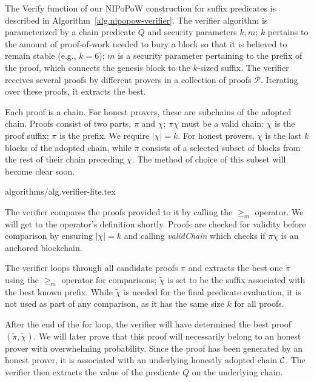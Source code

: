 The \textsf{Verify} function of our NIPoPoW construction  for suffix predicates
is described in
Algorithm~\ref{alg.nipopow-verifier}. The verifier algorithm is parameterized by
a chain predicate $Q$ and security parameters $k, m$; $k$
pertains to the amount of proof-of-work needed to bury a block so that it is
believed to remain stable (e.g., $k = 6$); $m$ is a security
parameter pertaining to the prefix of the proof, which connects the genesis
block to the $k$-sized suffix. The verifier receives several proofs by
different provers in a collection of proofs $\mathcal{P}$. Iterating over these
proofs, it extracts the best.

Each proof is a chain. For honest provers, these are subchains of the  adopted
chain. Proofs consist of two parts, $\pi$ and $\chi$; $\pi \chi$ must be a valid
chain; $\chi$ is the proof suffix; $\pi$ is the prefix. We require $|\chi| = k$.
For honest provers, $\chi$ is the last $k$ blocks of the adopted chain, while
$\pi$ consists of a selected subset of blocks from the rest of their chain
preceding $\chi$. The method of choice of this subset will become clear soon.

{algorithms/alg.verifier-lite.tex}

The verifier compares the proofs provided to it by calling the $\geq_m$
operator. We will get to the operator's definition
shortly. Proofs are checked for validity before comparison by ensuring $|\chi| =
k$ and calling \textit{validChain} which checks if $\pi\chi$ is an anchored
blockchain.

The verifier loops through all candidate proofs $\pi$ and extracts the best one
$\tilde\pi$ using the $\geq_m$ operator for comparisons; $\tilde\chi$ is set to
be the suffix associated with the best known prefix. While $\tilde\chi$ is
needed for the final predicate evaluation, it is not used as part of any
comparison, as it has the same size $k$ for all proofs.

After the end of the for loop, the verifier will have determined the best proof
$(\tilde\pi, \tilde\chi)$. We will later prove that this proof will necessarily
belong to an honest prover with overwhelming probability. Since the proof has
been generated by an honest prover, it is associated with an underlying honestly
adopted chain $\mathcal{C}$. The verifier then extracts the value of the predicate
$Q$ on the underlying chain.

